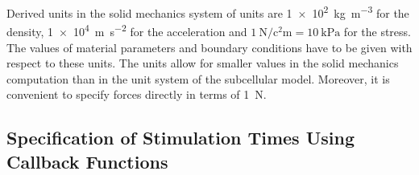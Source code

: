Derived units in the solid mechanics system of units are \SI{1e2}{\kilogram\per\meter\cubed} for the density, \SI{1e4}{\meter\per\square\second} for the acceleration and $\SI{1}{\newton\per\square\centi\meter} = \SI{10}{\kilo\pascal}$ for the stress. The values of material parameters and boundary conditions have to be given with respect to these units.
The units allow for smaller values in the solid mechanics computation than in the unit system of the subcellular model. Moreover, it is  convenient to specify forces directly in terms of \SI{1}{\newton}.

% 
% 
% 
% 

\subsection{Specification of Stimulation Times Using Callback Functions}\label{sec:stimulation_times_callbacks}

